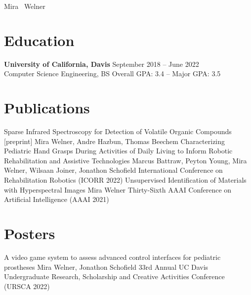 \documentclass[a4paper,11pt]{comcv}
\begin{document}

\begin{center}
  {\fontsize{25pt}{30pt}\selectfont
    \thinheader\color{black} Mira~%
    \regularheader\color{gray} Welner%
  }
\end{center}


\begin{center}
\end{center}
\vspace{-0.5em}

\horbar
\vspace{0.2em}


\section{Education}
\begin{educationsection}
\textbf{University of California, Davis} \hfill September 2018 -- June 2022\\
Computer Science Engineering, BS \hfill Overall GPA: 3.4 -- Major GPA: 3.5
\end{educationsection}


\section{Publications}
\posterentry
  {Sparse Infrared Spectroscopy for Detection of Volatile Organic Compounds [preprint]}
  {Mira Welner, Andre Hazbun, Thomas Beechem}
  {}
\posterentry
  {Characterizing Pediatric Hand Grasps During Activities of Daily Living to Inform
  Robotic Rehabilitation and Assistive Technologies}
  {Marcus Battraw, Peyton Young, Mira Welner, Wilsaan Joiner, Jonathon Schofield}
  {International Conference on Rehabilitation Robotics (ICORR 2022)}
\posterentry
  {Unsupervised Identification of Materials with Hyperspectral Images}
  {Mira Welner}
  {Thirty-Sixth AAAI Conference on Artificial Intelligence (AAAI 2021)}
\vspace{0.7em}

\section{Posters}
\posterentry
  {A video game system to assess advanced control interfaces for pediatric prostheses}
  {Mira Welner, Jonathon Schofield}
  {33rd Annual UC Davis Undergraduate Research, Scholarship and Creative Activities Conference (URSCA 2022)}
\end{document}

